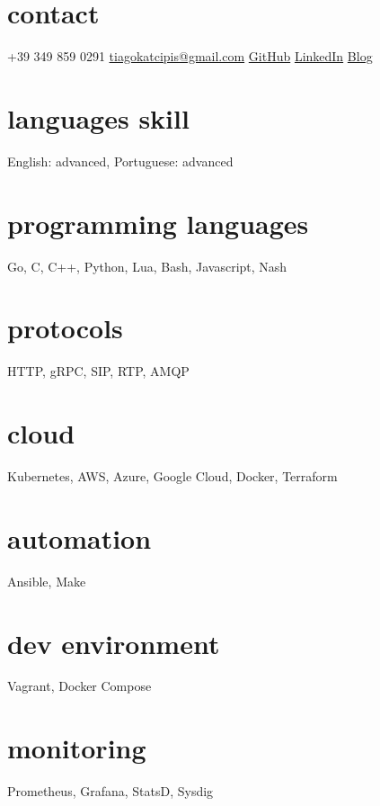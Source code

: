 \documentclass[]{friggeri-cv} %
\begin{document}


\begin{aside} %
\section{contact}
+39 349 859 0291
\href{mailto:tiagokatcipis@gmail.com}{tiagokatcipis@gmail.com}
\href{https://github.com/katcipis}{GitHub}
\href{http://www.linkedin.com/pub/tiago-katcipis/1b/273/8b0}{LinkedIn}
\href{http://katcipis.github.io/}{Blog}
\section{languages skill}
English: advanced, Portuguese: advanced
\section{programming languages}
Go, C, C++, Python, Lua, Bash, Javascript, Nash
\section{protocols}
HTTP, gRPC, SIP, RTP, AMQP
\section{cloud}
Kubernetes, AWS, Azure, Google Cloud, Docker, Terraform
\section{automation}
Ansible, Make
\section{dev environment}
Vagrant, Docker Compose
\section{monitoring}
Prometheus, Grafana, StatsD, Sysdig
\end{aside}

\end{document}
